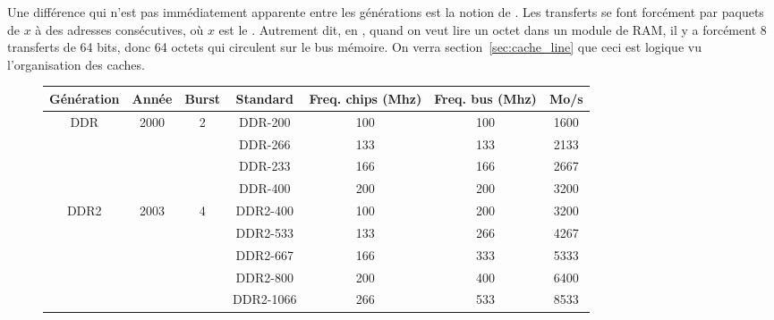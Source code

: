 Une différence qui n'est pas immédiatement apparente entre les générations est
la notion de \og {}\fg. Les transferts se font forcément par
paquets de $x$ à des adresses consécutives, où $x$ est le
. Autrement dit, en \the\year, quand on veut lire un octet dans
un module de RAM, il y a forcément 8 transferts de 64 bits, donc 64 octets qui
circulent sur le bus mémoire. On verra section~\ref{sec:cache_line} que ceci est
logique vu l'organisation des caches.

\begin{figure}
  \centering
  \begin{tabular}{|c|c|c|c|c|c|c|}
  \hline
  Génération            & Année                 & Burst              & Standard   & Freq. chips (Mhz) & Freq. bus (Mhz) & Mo/s \\
  \hline\hline                                                                                      
  \multirow{4}{*}{DDR}  & \multirow{4}{*}{2000} & \multirow{4}{*}{2} & DDR-200    & 100               & 100             &  1600 \\
                        &                       &                    & DDR-266    & 133               & 133             &  2133 \\
                        &                       &                    & DDR-233    & 166               & 166             &  2667 \\
                        &                       &                    & DDR-400    & 200               & 200             &  3200 \\
  \hline                                                                                            
  \multirow{5}{*}{DDR2} & \multirow{5}{*}{2003} & \multirow{5}{*}{4} & DDR2-400   & 100               & 200             &  3200 \\
                        &                       &                    & DDR2-533   & 133               & 266             &  4267 \\
                        &                       &                    & DDR2-667   & 166               & 333             &  5333 \\
                        &                       &                    & DDR2-800   & 200               & 400             &  6400 \\
                        &                       &                    & DDR2-1066  & 266               & 533             &  8533 \\
  \hline                                                                                            

\end{tabular}
\end{figure}
